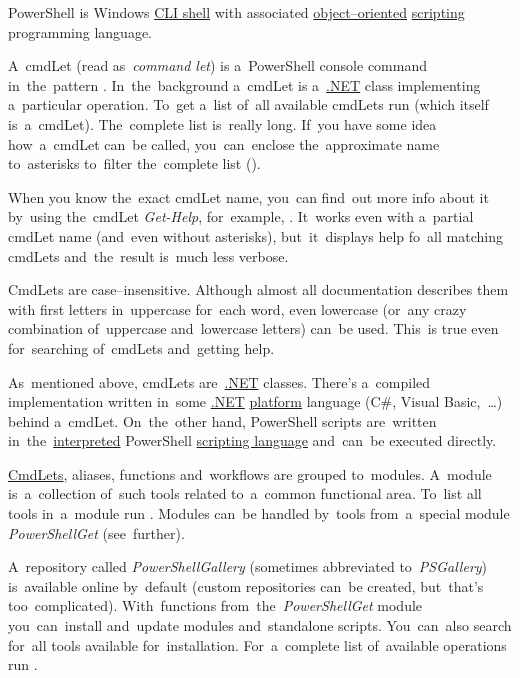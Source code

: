 \label{powershell}
PowerShell is Windows \hyperref[shellcligui]{CLI shell} with associated \hyperref[objectorientedprogramming]{object--oriented} \hyperref[scriptinglanguages]{scripting} programming language.

\label{cmdlet}
A~cmdLet (read as~\textit{command let}) is a~PowerShell console command in~the~pattern . In~the~background a~cmdLet is a~\hyperref[dotnet]{.NET} class implementing a~particular operation. To~get a~list of~all available cmdLets run  (which itself is~a~cmdLet). The~complete list is~really long. If~you have some idea how~a~cmdLet can~be called, you~can~enclose the~approximate name to~asterisks to~filter the~complete list ().

When you know the~exact cmdLet name, you~can find~out more info about it by~using the~cmdLet \textit{Get-Help}, for~example, . It~works even with a~partial cmdLet name (and~even without asterisks), but~it~displays help fo~all matching cmdLets and~the~result is~much less verbose.

CmdLets are case--insensitive. Although almost all documentation describes them with first letters in~uppercase for~each word, even lowercase (or~any crazy combination of~uppercase and~lowercase letters) can~be used. This~is true even for~searching of~cmdLets and~getting help.

As~mentioned above, cmdLets are~\hyperref[dotnet]{.NET} classes. There's a~compiled implementation written in~some \hyperref[dotnet]{.NET} \hyperref[platform]{platform} language (C\#, Visual Basic,~\dots) behind a~cmdLet. On~the~other hand, PowerShell scripts are~written in~the~\hyperref[compiledinterpretedlanguages]{interpreted} PowerShell \hyperref[scriptinglanguages]{scripting language} and~can~be executed directly.

\label{powershellmodule}
\hyperref[cmdlet]{CmdLets}, aliases, functions and~workflows are grouped to~modules. A~module is~a~collection of~such tools related to~a~common functional area. To~list all tools in~a~module run . Modules can~be handled by~tools from~a~special module \textit{PowerShellGet} (see~further).

A~repository called \textit{PowerShellGallery} (sometimes abbreviated to~\textit{PSGallery}) is~available online by~default (custom repositories can~be created, but~that's too~complicated). With~functions from~the~\textit{PowerShellGet} module you~can~install and~update modules and~standalone scripts. You~can~also search for~all tools available for~installation. For~a~complete list of~available operations run .

